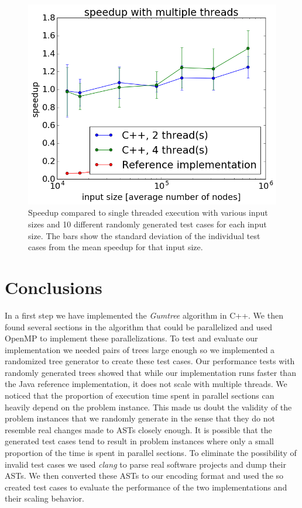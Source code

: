 \documentclass[letterpaper]{article}
\begin{document}
\begin{figure}
	\includegraphics[width=\linewidth]{speedupPlot_c}
	\caption{Speedup compared to single threaded execution with various input sizes and 10 different randomly generated test cases for each input size. The bars show the standard deviation of the individual test cases from the mean speedup for that input size.}
	\label{fig:cpp_speedup}
\end{figure}

\section{Conclusions}

In a first step we have implemented the \emph{Gumtree} algorithm in C++.
We then found several sections in the algorithm that could be parallelized and used OpenMP to implement these parallelizations.
To test and evaluate our implementation we needed pairs of trees large enough so we implemented a randomized tree generator to create these test cases.
Our performance tests with randomly generated trees showed that while our implementation runs faster than the Java reference implementation, it does not scale with multiple threads.
We noticed that the proportion of execution time spent in parallel sections can heavily depend on the problem instance.
This made us doubt the validity of the problem instances that we randomly generate in the sense that they do not resemble real changes made to ASTs closely enough.
It is possible that the generated test cases tend to result in problem instances where only a small proportion of the time is spent in parallel sections.
To eliminate the possibility of invalid test cases we used \emph{clang} to parse real software projects and dump their ASTs.
We then converted these ASTs to our encoding format and used the so created test cases to evaluate the performance of the two implementations and their scaling behavior.



\end{document}
